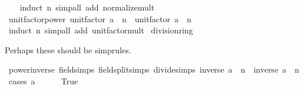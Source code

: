 \begin{isabellebody}
%
\isadelimproof
\ \ %
\endisadelimproof
%
\isatagproof
{}\isamarkupfalse%
\ {\isacharparenleft}{\kern0pt}induct\ n{\isacharparenright}{\kern0pt}\ {\isacharparenleft}{\kern0pt}simp{\isacharunderscore}{\kern0pt}all\ add{\isacharcolon}{\kern0pt}\ normalize{\isacharunderscore}{\kern0pt}mult{\isacharparenright}{\kern0pt}%
\endisatagproof
{\isafoldproof}%
%
\isadelimproof
\isanewline
%
\endisadelimproof
\isanewline
{}\isamarkupfalse%
\ unit{\isacharunderscore}{\kern0pt}factor{\isacharunderscore}{\kern0pt}power{\isacharcolon}{\kern0pt}\ {\isachardoublequoteopen}unit{\isacharunderscore}{\kern0pt}factor\ {\isacharparenleft}{\kern0pt}a\ {\isacharcircum}{\kern0pt}\ n{\isacharparenright}{\kern0pt}\ {\isacharequal}{\kern0pt}\ unit{\isacharunderscore}{\kern0pt}factor\ a\ {\isacharcircum}{\kern0pt}\ n{\isachardoublequoteclose}\isanewline
%
\isadelimproof
\ \ %
\endisadelimproof
%
\isatagproof
{}\isamarkupfalse%
\ {\isacharparenleft}{\kern0pt}induct\ n{\isacharparenright}{\kern0pt}\ {\isacharparenleft}{\kern0pt}simp{\isacharunderscore}{\kern0pt}all\ add{\isacharcolon}{\kern0pt}\ unit{\isacharunderscore}{\kern0pt}factor{\isacharunderscore}{\kern0pt}mult{\isacharparenright}{\kern0pt}%
\endisatagproof
{\isafoldproof}%
%
\isadelimproof
\isanewline
%
\endisadelimproof
\isanewline
{}\isamarkupfalse%
\isanewline
\isanewline
{}\isamarkupfalse%
\ division{\isacharunderscore}{\kern0pt}ring\isanewline
{}%
\begin{isamarkuptext}%
Perhaps these should be simprules.%
\end{isamarkuptext}\isamarkuptrue%
\isamarkupfalse%
\ power{\isacharunderscore}{\kern0pt}inverse\ {\isacharbrackleft}{\kern0pt}field{\isacharunderscore}{\kern0pt}simps{\isacharcomma}{\kern0pt}\ field{\isacharunderscore}{\kern0pt}split{\isacharunderscore}{\kern0pt}simps{\isacharcomma}{\kern0pt}\ divide{\isacharunderscore}{\kern0pt}simps{\isacharbrackright}{\kern0pt}{\isacharcolon}{\kern0pt}\ {\isachardoublequoteopen}inverse\ a\ {\isacharcircum}{\kern0pt}\ n\ {\isacharequal}{\kern0pt}\ inverse\ {\isacharparenleft}{\kern0pt}a\ {\isacharcircum}{\kern0pt}\ n{\isacharparenright}{\kern0pt}{\isachardoublequoteclose}\isanewline
%
\isadelimproof
%
\endisadelimproof
%
\isatagproof
{}\isamarkupfalse%
\ {\isacharparenleft}{\kern0pt}cases\ {\isachardoublequoteopen}a\ {\isacharequal}{\kern0pt}\ {}{\isachardoublequoteclose}{\isacharparenright}{\kern0pt}\isanewline
\ \ \isamarkupfalse%
\ True\isanewline
\ \ \isamarkupfalse%

\end{isabellebody}
